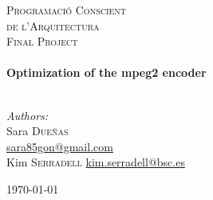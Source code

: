 
\begin{titlepage}
\begin{center}

\bigskip



\textsc{\LARGE Programació Conscient}\\[0.2cm]
\textsc{\LARGE de l'Arquitectura}\\[1.5cm]
\textsc{\Large Final Project}\\[0.5cm]


\HRule \\[0.4cm]
{ \huge \bfseries Optimization of the mpeg2 encoder}\\[0.4cm]

\HRule \\[1.5cm]

\end{center}

\begin{minipage}{0.4\textwidth}
\begin{flushleft} \large
\emph{Authors:}\\
Sara \textsc{Dueñas}\\
\url{sara85gon@gmail.com}\\[0.5cm]
Kim \textsc{Serradell} 
\url{kim.serradell@bsc.es}
\end{flushleft}
\end{minipage}

\vfill
\begin{center}
{\large \today}
\end{center}


\end{titlepage}
